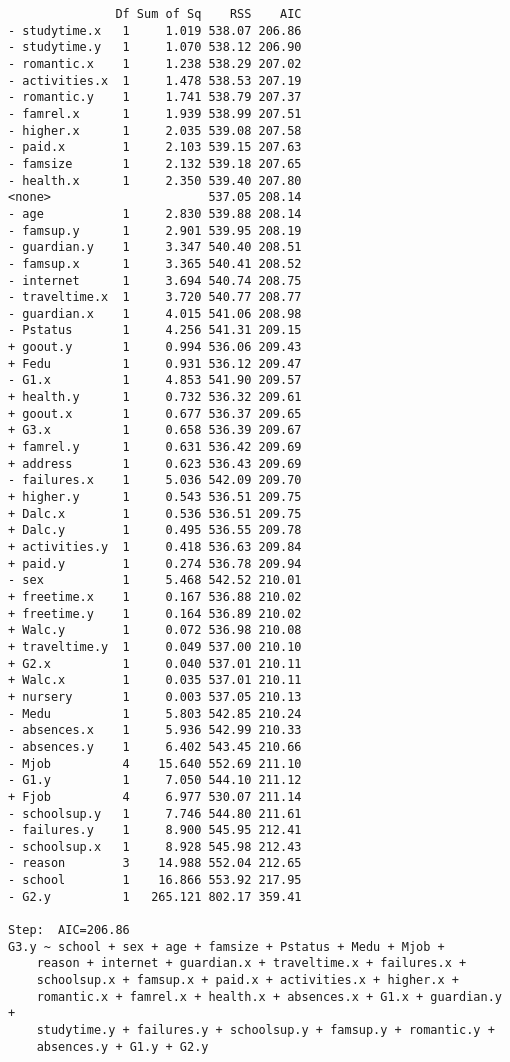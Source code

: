 \documentclass[11pt]{article}
\begin{document}
\begin{enumerate}
\begin{verbatim}
               Df Sum of Sq    RSS    AIC
- studytime.x   1     1.019 538.07 206.86
- studytime.y   1     1.070 538.12 206.90
- romantic.x    1     1.238 538.29 207.02
- activities.x  1     1.478 538.53 207.19
- romantic.y    1     1.741 538.79 207.37
- famrel.x      1     1.939 538.99 207.51
- higher.x      1     2.035 539.08 207.58
- paid.x        1     2.103 539.15 207.63
- famsize       1     2.132 539.18 207.65
- health.x      1     2.350 539.40 207.80
<none>                      537.05 208.14
- age           1     2.830 539.88 208.14
- famsup.y      1     2.901 539.95 208.19
- guardian.y    1     3.347 540.40 208.51
- famsup.x      1     3.365 540.41 208.52
- internet      1     3.694 540.74 208.75
- traveltime.x  1     3.720 540.77 208.77
- guardian.x    1     4.015 541.06 208.98
- Pstatus       1     4.256 541.31 209.15
+ goout.y       1     0.994 536.06 209.43
+ Fedu          1     0.931 536.12 209.47
- G1.x          1     4.853 541.90 209.57
+ health.y      1     0.732 536.32 209.61
+ goout.x       1     0.677 536.37 209.65
+ G3.x          1     0.658 536.39 209.67
+ famrel.y      1     0.631 536.42 209.69
+ address       1     0.623 536.43 209.69
- failures.x    1     5.036 542.09 209.70
+ higher.y      1     0.543 536.51 209.75
+ Dalc.x        1     0.536 536.51 209.75
+ Dalc.y        1     0.495 536.55 209.78
+ activities.y  1     0.418 536.63 209.84
+ paid.y        1     0.274 536.78 209.94
- sex           1     5.468 542.52 210.01
+ freetime.x    1     0.167 536.88 210.02
+ freetime.y    1     0.164 536.89 210.02
+ Walc.y        1     0.072 536.98 210.08
+ traveltime.y  1     0.049 537.00 210.10
+ G2.x          1     0.040 537.01 210.11
+ Walc.x        1     0.035 537.01 210.11
+ nursery       1     0.003 537.05 210.13
- Medu          1     5.803 542.85 210.24
- absences.x    1     5.936 542.99 210.33
- absences.y    1     6.402 543.45 210.66
- Mjob          4    15.640 552.69 211.10
- G1.y          1     7.050 544.10 211.12
+ Fjob          4     6.977 530.07 211.14
- schoolsup.y   1     7.746 544.80 211.61
- failures.y    1     8.900 545.95 212.41
- schoolsup.x   1     8.928 545.98 212.43
- reason        3    14.988 552.04 212.65
- school        1    16.866 553.92 217.95
- G2.y          1   265.121 802.17 359.41

Step:  AIC=206.86
G3.y ~ school + sex + age + famsize + Pstatus + Medu + Mjob + 
    reason + internet + guardian.x + traveltime.x + failures.x + 
    schoolsup.x + famsup.x + paid.x + activities.x + higher.x + 
    romantic.x + famrel.x + health.x + absences.x + G1.x + guardian.y + 
    studytime.y + failures.y + schoolsup.y + famsup.y + romantic.y + 
    absences.y + G1.y + G2.y


\end{verbatim}
\end{enumerate}
\end{document}
